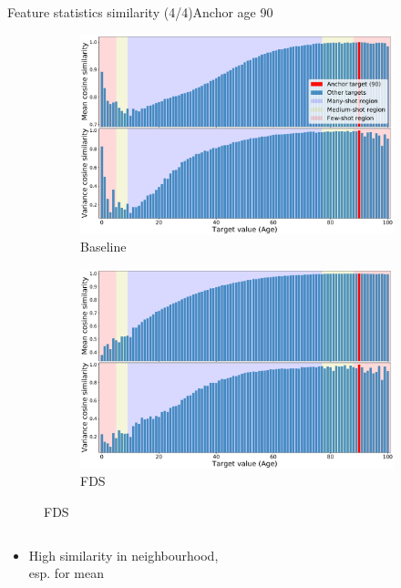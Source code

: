 \begin{frame}{Feature statistics similarity (4/4)}{Anchor age 90}
	\begin{figure}[h]
		\begin{subfigure}{0.48\textwidth}
			\includegraphics[width=\linewidth]{images/feat_sim_fds_base_90.pdf}
			\caption{Baseline}
		\end{subfigure}\hspace{1em}%
		\begin{subfigure}{0.48\textwidth}
			\includegraphics[width=\linewidth]{images/feat_sim_fds_ours_90.pdf}
			\caption{FDS}
		\end{subfigure}
	\end{figure}
	\vspace{-1em}
	\begin{columns}
		\footnotesize
		\begin{column}{0.5\textwidth}
			\begin{itemize}
				\item High similarity in neighbourhood, \\esp. for mean

\end{itemize}
\end{column}
\end{columns}
\end{frame}
